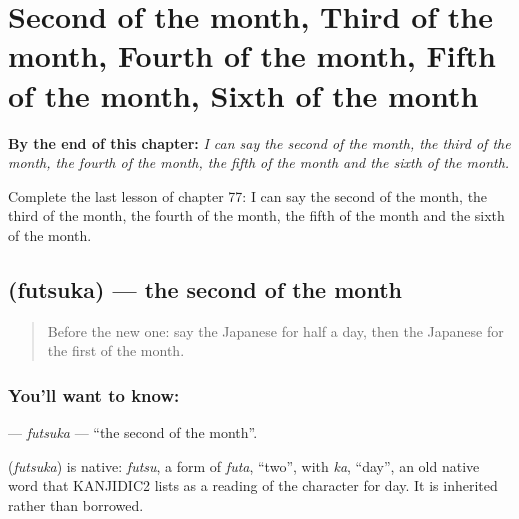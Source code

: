 
\chapter{Second of the month, Third of the month, Fourth of the month, Fifth of the month, Sixth of the month}
\label{ch:ja-second-of-the-month-third-of-the-month-fourth-of-the-month-fifth-of-the-month-sixth-of-the-month}

\begin{chapteropening}
\textbf{By the end of this chapter:} \emph{I can say the second of the month, the third of the month, the fourth of the month, the fifth of the month and the sixth of the month.}

Complete the last lesson of chapter 77: I can say the second of the month, the third of the month, the fourth of the month, the fifth of the month and the sixth of the month.
\end{chapteropening}

\section[\texorpdfstring{\ja{ふつか} (futsuka)}{ふつか (futsuka)}]{ (futsuka) — the second of the month}

\label{lesson:JA-C77-futsuka}



\begin{quote}
Before the new one: say the Japanese for half a day, then the Japanese for the first of the month.
\end{quote}

\subsection*{You'll want to know: }
\textbf{} — \emph{futsuka} — \textquotedblleft{}the second of the month\textquotedblright{}.

\begin{cousinweb}
\textbf{} (\emph{futsuka}) is native: \emph{futsu}, a form of \emph{futa}, \textquotedblleft{}two\textquotedblright{}, with \emph{ka}, \textquotedblleft{}day\textquotedblright{}, an old native word that KANJIDIC2 lists as a reading of the character for day. It is inherited rather than borrowed.
\end{cousinweb}

